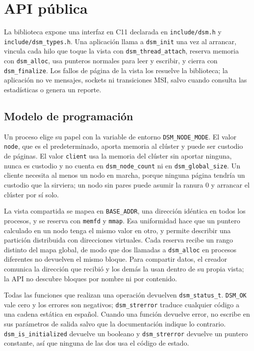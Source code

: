 \section{API pública}\label{sec:api}

La biblioteca expone una interfaz en C11 declarada en \texttt{include/dsm.h} y \texttt{include/dsm\_types.h}. Una aplicación llama a \texttt{dsm\_init} una vez al arrancar, vincula cada hilo que toque la vista con \texttt{dsm\_thread\_attach}, reserva memoria con \texttt{dsm\_alloc}, usa punteros normales para leer y escribir, y cierra con \texttt{dsm\_finalize}. Los fallos de página de la vista los resuelve la biblioteca; la aplicación no ve mensajes, sockets ni transiciones MSI, salvo cuando consulta las estadísticas o genera un reporte.

\subsection{Modelo de programación}

Un proceso elige su papel con la variable de entorno \texttt{DSM\_NODE\_MODE}. El valor \texttt{node}, que es el predeterminado, aporta memoria al clúster y puede ser custodio de páginas. El valor \texttt{client} usa la memoria del clúster sin aportar ninguna, nunca es custodio y no cuenta en \texttt{dsm\_node\_count} ni en \texttt{dsm\_global\_size}. Un cliente necesita al menos un nodo en marcha, porque ninguna página tendría un custodio que la sirviera; un nodo sin pares puede asumir la ranura 0 y arrancar el clúster por sí solo.

La vista compartida se mapea en \texttt{BASE\_ADDR}, una dirección idéntica en todos los procesos, y se reserva con \texttt{memfd} y \texttt{mmap}. Esa uniformidad hace que un puntero calculado en un nodo tenga el mismo valor en otro, y permite describir una partición distribuida con direcciones virtuales. Cada reserva recibe un rango distinto del mapa global, de modo que dos llamadas a \texttt{dsm\_alloc} en procesos diferentes no devuelven el mismo bloque. Para compartir datos, el creador comunica la dirección que recibió y los demás la usan dentro de su propia vista; la API no descubre bloques por nombre ni por contenido.

Todas las funciones que realizan una operación devuelven \texttt{dsm\_status\_t}. \texttt{DSM\_OK} vale cero y los errores son negativos; \texttt{dsm\_strerror} traduce cualquier código a una cadena estática en español. Cuando una función devuelve error, no escribe en sus parámetros de salida salvo que la documentación indique lo contrario. \texttt{dsm\_is\_initialized} devuelve un booleano y \texttt{dsm\_strerror} devuelve un puntero constante, así que ninguna de las dos usa el código de estado.

